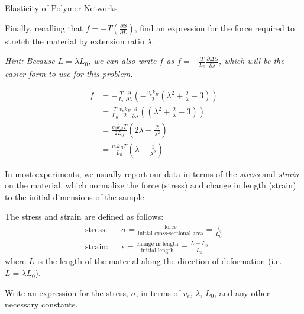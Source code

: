 \begin{activity}{Elasticity of Polymer Networks}
\begin{ctqs}
	\question Finally, recalling that $f = -T\left(\frac{\partial S}{\partial L}\right)$, find an expression for the force required to stretch the material by extension ratio $\lambda$.
	
		\emph{Hint: Because $L = \lambda L_0$, we can also write $f$ as $f = -\frac{T}{L_0}\frac{\partial \Delta S}{\partial \lambda}$, which will be the easier form to use for this problem.}
		
			\begin{solution}[2.5in]{}
			
				\begin{align*}
					f &= -\frac{T}{L_0}\frac{\partial}{\partial \lambda} \left(-\frac{v_e k_B}{2}\left(\lambda^2 + \frac{2}{\lambda} - 3\right)\right)\\
						&= \frac{T}{L_0}\frac{v_e k_B}{2}\frac{\partial}{\partial \lambda} \left(\left(\lambda^2 + \frac{2}{\lambda} - 3\right)\right)\\
						&= \frac{v_e k_B T}{2 L_0}\left(2\lambda - \frac{2}{\lambda^2} \right)\\
						&= \frac{v_e k_B T}{L_0}\left(\lambda - \frac{1}{\lambda^2} \right)
				\end{align*}
			\end{solution}
	
\end{ctqs}

\begin{model}

	In most experiments, we usually report our data in terms of the \emph{stress} and \emph{strain} on the material, which normalize the force (stress) and change in length (strain) to the initial dimensions of the sample.
	
	The stress and strain are defined as follows:
	\begin{align*}
		\text{stress:} && \sigma = \frac{\text{force}}{\text{initial cross-sectional area}} = \frac{f}{L_0^2} \\
		\text{strain:} && \epsilon = \frac{\text{change in length}}{\text{initial length}} = \frac{L-L_0}{L_0}
	\end{align*}
	where $L$ is the length of the material along the direction of deformation (i.e. $L = \lambda L_0$).
	
\end{model}

\begin{ctqs}

	\question Write an expression for the stress, $\sigma$, in terms of $v_e$, $\lambda$, $L_0$, and any other necessary constants.
	

\end{ctqs}
\end{activity}
